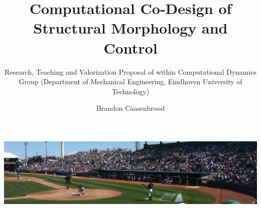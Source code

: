 \documentclass[acmtog]{acmart}
\begin{document}
\title{Computational Co-Design of Structural Morphology and Control}
\subtitle{Research, Teaching and Valorization Proposal of within Computational Dynamics Group  (Department of Mechanical Engineering, Eindhoven University of Technology)}

\author{Brandon Caasenbrood}
\authornotemark[1]

\renewcommand{\shortauthors}{Trovato et al.}

\begin{abstract}

\end{abstract}


\begin{teaserfigure}
  \includegraphics[width=\textwidth]{sampleteaser}
  \caption{}
  \label{fig:teaser}
\end{teaserfigure}


\maketitle



\end{document}
